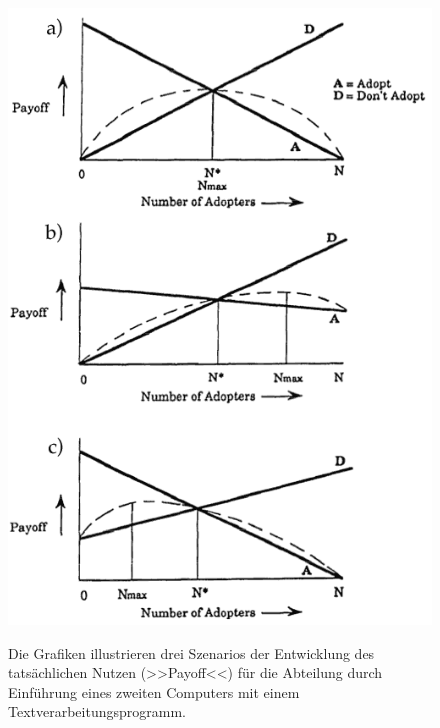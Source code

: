 \begin{figure}
	        {\includegraphics[width=1\linewidth]{gfx/markusCongestedTextProcessor}}
		\caption[>>Payoff<< durch Nutzung zweier Textverarbeitungsmaschinen \newline \citep{Markus:1990}]{Die Grafiken illustrieren drei Szenarios der Entwicklung des tatsächlichen Nutzen (>>Payoff<<) für die Abteilung durch Einführung eines zweiten Computers mit einem Textverarbeitungsprogramm.}\label{fig:markusText}
\end{figure}
	
